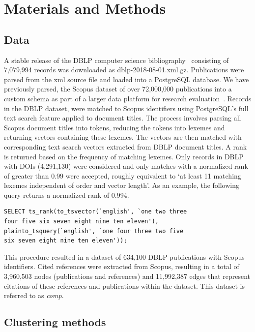 \section{Materials and Methods}
\label{sec:methods}

\subsection{Data}
 A stable release of the DBLP computer science bibliography~\cite{dblp_ref} consisting of 7,079,994 records was downloaded as dblp-2018-08-01.xml.gz. Publications were parsed from the xml source file and loaded into a PostgreSQL database. We have previously parsed, the Scopus dataset of over 72,000,000 publications into a custom schema as part of a larger data platform for research evaluation~\cite{GithubERNIE2019}. Records in the DBLP dataset, were matched to Scopus identifiers using PostgreSQL's full text search feature applied to document titles. The process involves parsing all Scopus document titles into tokens, reducing the tokens into lexemes and returning vectors containing these lexemes. The vectors are then matched with corresponding text search vectors extracted from DBLP document titles. A rank is returned based on the frequency of matching lexemes. Only records in DBLP with DOIs (4,291,130) were considered and only matches with a normalized rank of greater than 0.99 were accepted, roughly equivalent to `at least 11 matching lexemes independent of order and vector length'. As an example, the following query returns a normalized rank of 0.994.
\begin{lstlisting}
SELECT ts_rank(to_tsvector(`english', `one two three 
four five six seven eight nine ten eleven'), 
plainto_tsquery(`english', `one four three two five 
six seven eight nine ten eleven')); 
\end{lstlisting}

This procedure resulted in a dataset of 634,100 DBLP publications with Scopus identifiers. Cited references were extracted from Scopus, resulting in a total of 3,960,503 nodes (publications and references) and 11,992,387 edges that represent citations of these references and publications within the dataset. This dataset is referred to as \emph{comp}.\par


\subsection{Clustering methods}

